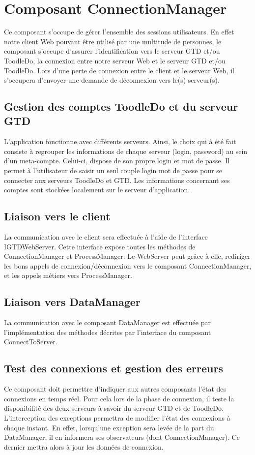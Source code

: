 
\section{Composant ConnectionManager}


Ce composant s'occupe de gérer l'ensemble des sessions utilisateurs. 
En effet notre client Web pouvant être utilisé par une multitude de personnes, le composant s'occupe d'assurer 
l'identification vers le serveur GTD et/ou ToodleDo, la connexion entre notre
serveur Web et le serveur GTD et/ou ToodleDo. Lors d'une perte de connexion
entre le client et le serveur Web, il s'occupera d'envoyer une demande de
déconnexion vers le(s) serveur(s).

	\subsection{Gestion des comptes ToodleDo et du serveur GTD}
	L'application fonctionne avec différents serveurs. Ainsi, le choix qui à été fait consiste à regrouper les informations de chaque serveur (login, password) au sein d'un meta-compte. Celui-ci, dispose de son propre login et mot de passe. Il permet à l'utilisateur de saisir un seul couple login mot de passe pour se connecter aux serveurs ToodleDo et GTD. Les informations concernant ses comptes sont stockées localement sur le serveur d'application.

	\subsection{Liaison vers le client}
	La communication avec le client sera effectuée à l'aide de l'interface
	IGTDWebServer. Cette interface expose toutes les méthodes de
	ConnectionManager et ProcessManager. Le WebServer peut grâce à elle,
	rediriger les bons appels de connexion/déconnexion vers le composant
	ConnectionManager, et les appels métiers vers ProcessManager.


	\subsection{Liaison vers DataManager}
	La communication avec le composant DataManager est effectuée par
	l'implémentation des méthodes décrites par l'interface du composant ConnectToServer.
	
	\subsection{Test des connexions et gestion des erreurs}
	Ce composant doit permettre d'indiquer aux autres composants l'état des connexions en temps réel. Pour cela lors de la phase de 
	connexion, il teste la disponibilité des deux serveurs à savoir du serveur GTD
	et de ToodleDo. L'interception des exceptions permettra de modifier l'état des
	connexions à chaque instant. En effet, lorsqu'une exception sera levée de la part du DataManager, il en informera ses observateurs (dont ConnectionManager). Ce dernier mettra alors à jour les données de connexion.

